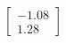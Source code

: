 \documentclass[preview]{standalone}
\begin{document}
\begin{align*}
\begin{bmatrix} -1.08 \\ 1.28 \end{bmatrix}
\end{align*}
\end{document}
